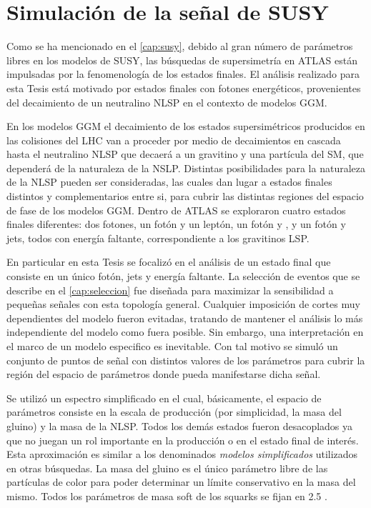 \section{Simulación de la señal de SUSY}\label{sec:sig_samples}

Como se ha mencionado en el \cref{cap:susy}, debido al gran número de parámetros
libres en los modelos de SUSY, las búsquedas de supersimetría en ATLAS están
impulsadas por la fenomenología de los estados finales. El análisis realizado
para esta Tesis está motivado por estados finales con fotones energéticos,
provenientes del decaimiento de un neutralino NLSP en el contexto de modelos
GGM.

En los modelos GGM el decaimiento de los estados supersimétricos producidos en
las colisiones del LHC van a proceder por medio de decaimientos en cascada hasta
el neutralino NLSP que decaerá a un gravitino y una partícula del SM, que
dependerá de la naturaleza de la NSLP. Distintas posibilidades para la
naturaleza de la NLSP pueden ser consideradas, las cuales dan lugar a estados
finales distintos y complementarios entre si, para cubrir las distintas regiones
del espacio de fase de los modelos GGM. Dentro de ATLAS se exploraron cuatro
estados finales diferentes: dos fotones, un fotón y un leptón, un fotón y
{\bjets}, y un fotón y jets, todos con energía faltante, correspondiente a los
gravitinos LSP.

En particular en esta Tesis se focalizó en el análisis de un estado final que
consiste en un único fotón, jets y energía faltante.
La selección de eventos que se describe en el \cref{cap:seleccion} fue diseñada para
maximizar la sensibilidad a pequeñas señales con esta topología general.
Cualquier imposición de cortes muy dependientes del modelo fueron evitadas,
tratando de mantener el análisis lo más independiente del modelo como fuera
posible. Sin embargo, una interpretación en el marco de un modelo especifico es
inevitable. Con tal motivo se simuló un conjunto de puntos de señal con
distintos valores de los parámetros para cubrir la región del espacio de
parámetros donde pueda manifestarse dicha señal.


Se utilizó un espectro simplificado en el cual, básicamente, el espacio de
parámetros consiste en la escala de producción (por simplicidad, la masa del
gluino) y la masa de la NLSP. Todos los demás estados fueron desacoplados ya que
no juegan un rol importante en la producción o en el estado final de interés.
Esta aproximación es similar a los denominados \emph{modelos simplificados}
utilizados en otras búsquedas.
La masa del gluino es el único parámetro libre de las partículas de color para
poder determinar un límite conservativo en la masa del mismo. Todos los
parámetros de masa soft de los squarks se fijan en 2.5 \tev.

